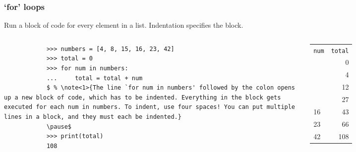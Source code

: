 \documentclass[notes]{beamer}
\begin{document}
	\begin{frame}[fragile]
		\frametitle{`for' loops}
		
		Run a block of code for every element in a list. Indentation specifies the block.
		
		\begin{columns}[c]
			\begin{lstlisting}
			>>> numbers = [4, 8, 15, 16, 23, 42]
			>>> total = 0
			>>> for num in numbers:
			...     total = total + num
			$ % \note<1>{The line `for num in numbers' followed by the colon opens up a new block of code, which has to be indented. Everything in the block gets executed for each num in numbers. To indent, use four spaces! You can put multiple lines in a block, and they must each be indented.}
			\pause$
			>>> print(total)
			108
			\end{lstlisting}
			
			\pause
			\begin{tabular}{l | r}
				\lstinline|num| & \lstinline|total| \\
				\, & 0 \\ \pause
				4 & 4 \\ \pause
				8 & 12 \\ \pause
				15 & 27 \\
				16 & 43 \\
				23 & 66 \\
				42 & 108 \\
			\end{tabular}
		\end{columns}
		
		
	\end{frame}
	
\end{document}
